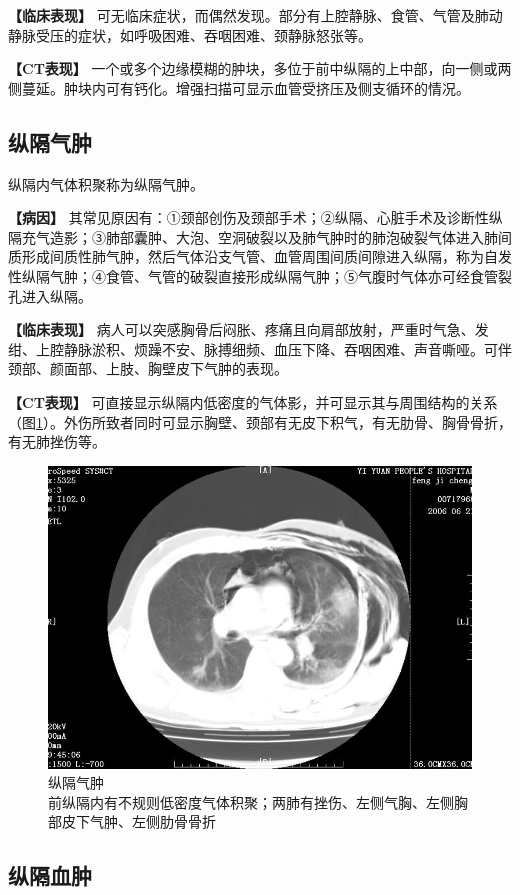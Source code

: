 \textbf{【临床表现】}
可无临床症状，而偶然发现。部分有上腔静脉、食管、气管及肺动静脉受压的症状，如呼吸困难、吞咽困难、颈静脉怒张等。

\textbf{【CT表现】}
一个或多个边缘模糊的肿块，多位于前中纵隔的上中部，向一侧或两侧蔓延。肿块内可有钙化。增强扫描可显示血管受挤压及侧支循环的情况。

\subsection{纵隔气肿}

纵隔内气体积聚称为纵隔气肿。

\textbf{【病因】}
其常见原因有：①颈部创伤及颈部手术；②纵隔、心脏手术及诊断性纵隔充气造影；③肺部囊肿、大泡、空洞破裂以及肺气肿时的肺泡破裂气体进入肺间质形成间质性肺气肿，然后气体沿支气管、血管周围间质间隙进入纵隔，称为自发性纵隔气肿；④食管、气管的破裂直接形成纵隔气肿；⑤气腹时气体亦可经食管裂孔进入纵隔。

\textbf{【临床表现】}
病人可以突感胸骨后闷胀、疼痛且向肩部放射，严重时气急、发绀、上腔静脉淤积、烦躁不安、脉搏细频、血压下降、吞咽困难、声音嘶哑。可伴颈部、颜面部、上肢、胸壁皮下气肿的表现。

\textbf{【CT表现】}
可直接显示纵隔内低密度的气体影，并可显示其与周围结构的关系（图\ref{fig9-52}）。外伤所致者同时可显示胸壁、颈部有无皮下积气，有无肋骨、胸骨骨折，有无肺挫伤等。

\begin{figure}[!htbp]
 \centering
 \includegraphics[width=.7\textwidth,height=\textheight,keepaspectratio]{./images/Image00254.jpg}
 \captionsetup{justification=centering}
 \caption{纵隔气肿\\{\small 前纵隔内有不规则低密度气体积聚；两肺有挫伤、左侧气胸、左侧胸部皮下气肿、左侧肋骨骨折}}
 \label{fig9-52}
  \end{figure} 

\subsection{纵隔血肿}

